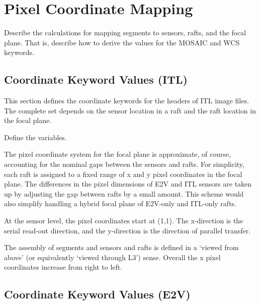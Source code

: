 \documentclass{article}[12pt]
\begin{document}
\section{Pixel Coordinate Mapping}
Describe the calculations for mapping segments to sensors, rafts, and the focal plane.  That is, describe how to derive the values for the MOSAIC and WCS keywords.

\subsection{Coordinate Keyword Values (ITL)\label{sec:coords_itl}}
This section defines the coordinate keywords for the headers of ITL image files.  The complete set depends on the sensor location in a raft and the raft location in the focal plane.

Define the variables.

The pixel coordinate system for the focal plane is approximate, of course, accounting for the nominal gaps between the sensors and rafts.  For simplicity, each raft is assigned to a fixed range of x and y pixel coordinates in the focal plane.  The differences in the pixel dimensions of E2V and ITL sensors are taken up by adjusting the gap between rafts by a small amount.  This scheme would also simplify handling a hybrid focal plane of E2V-only and ITL-only rafts.

At the sensor level, the pixel coordinates start at (1,1).  The x-direction is the serial read-out direction, and the y-direction is the direction of parallel transfer.  

The assembly of segments and sensors and rafts is defined in a `viewed from above' (or equivalently `viewed through L3') sense.  Overall the x pixel coordinates increase from right to left.


\subsection{Coordinate Keyword Values (E2V)\label{sec:coords_e2v}}
\end{document}
